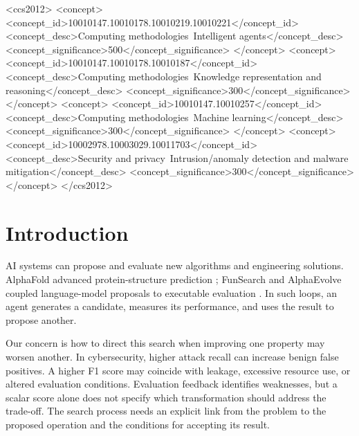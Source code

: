 \documentclass[sigconf]{acmart}
\begin{document}
\begin{CCSXML}
<ccs2012>
<concept>
<concept_id>10010147.10010178.10010219.10010221</concept_id>
<concept_desc>Computing methodologies~Intelligent agents</concept_desc>
<concept_significance>500</concept_significance>
</concept>
<concept>
<concept_id>10010147.10010178.10010187</concept_id>
<concept_desc>Computing methodologies~Knowledge representation and reasoning</concept_desc>
<concept_significance>300</concept_significance>
</concept>
<concept>
<concept_id>10010147.10010257</concept_id>
<concept_desc>Computing methodologies~Machine learning</concept_desc>
<concept_significance>300</concept_significance>
</concept>
<concept>
<concept_id>10002978.10003029.10011703</concept_id>
<concept_desc>Security and privacy~Intrusion/anomaly detection and malware mitigation</concept_desc>
<concept_significance>300</concept_significance>
</concept>
</ccs2012>
\end{CCSXML}




\let\trizaOriginalNoLinkUrl\nolinkurl
\renewcommand{\nolinkurl}[1]{%
  \trizaOriginalNoLinkUrl{#1}%
  \ifstrequal{#1}{liuwy@gdut.edu.cn}{\textsuperscript{*}}{}}
\maketitle
\let\nolinkurl\trizaOriginalNoLinkUrl

\section{Introduction}
\label{sec:introduction}

AI systems can propose and evaluate new algorithms and engineering solutions.
AlphaFold advanced protein-structure prediction \citep{jumper2021};
FunSearch and AlphaEvolve coupled language-model proposals to executable
evaluation \citep{romeraparedes2024,novikov2025}. In such loops, an agent
generates a candidate, measures its performance, and uses the result to
propose another.

Our concern is how to direct this search when improving one property
may worsen another. In cybersecurity, higher attack recall can increase
benign false positives. A higher F1 score may coincide with leakage,
excessive resource use, or altered evaluation conditions. Evaluation
feedback identifies weaknesses, but a scalar score alone does not specify
which transformation should address the trade-off. The search process
needs an explicit link from the problem to the proposed operation and
the conditions for accepting its result.
\end{document}

